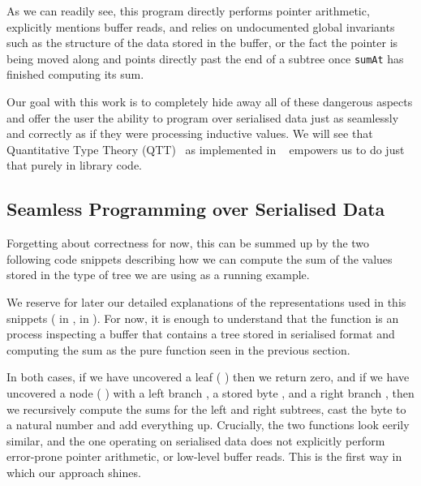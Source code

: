 As we can readily see, this program
directly performs pointer arithmetic,
explicitly mentions buffer reads,
and relies on undocumented global invariants
such as the structure of the data stored in the buffer,
or the fact the pointer is being moved along and points directly past
the end of a subtree once \texttt{sumAt} has finished computing
its sum.

Our goal with this work is to completely hide away all of these
dangerous aspects
and offer the user the ability to program over serialised data
just as seamlessly and correctly as
if they were processing inductive values.
%
We will see that
Quantitative Type Theory (QTT)~\cite{DBLP:conf/birthday/McBride16, DBLP:conf/lics/Atkey18}
as implemented in \idris{}~\cite{DBLP:conf/ecoop/Brady21}
empowers us to do just that purely in library code.

\subsection{Seamless Programming over Serialised Data}\label{sec:seamless}

Forgetting about correctness for now, this can be summed up by the
two following code snippets describing how we can compute the sum
of the values stored in the type of tree we are using as a running
example.



\begin{center}
  \begin{minipage}{.5\textwidth}
  \end{minipage}
\end{center}

We reserve for later our detailed explanations of the representations
used in this snippets
( in ,
 in ).
%
For now, it is enough to understand that the function
is an  process
inspecting a buffer that contains a tree stored in serialised format
and computing the sum as the pure function seen in the previous section.

In both cases, if we have uncovered a leaf
({ \IdrisData{\#}} \IdrisKeyword{\KatlaUnderscore{}})
then we return zero,
and if we have uncovered a node
({ \IdrisData{\#}}  \IdrisData{\#}  \IdrisData{\#} )
with
a left branch ,
a stored byte ,
and a right branch ,
then we recursively compute the sums for the left and right subtrees,
cast the byte to a natural number and add everything up.
%
Crucially, the two functions look eerily similar, and the one operating on
serialised data does not explicitly perform error-prone pointer arithmetic,
or low-level buffer reads.
%
This is the first way in which our approach shines.

